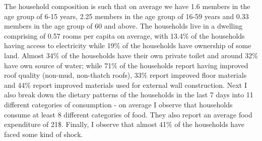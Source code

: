 \documentclass[12pt]{article}
\begin{document}
{\hspace{1cm} The household composition is such that on average we have 1.6 members in the age group of 6-15 years, 2.25 members in the age group of 16-59 years and 0.33 members in the age group of 60 and above. The households live in a dwelling comprising of 0.57 rooms per capita on average, with 13.4\% of the households having access to electricity while 19\% of the households have ownership of some land. Almost 34\% of the households have their own private toilet and around 32\% have own source of water; while 71\% of the households report having improved roof quality (non-mud, non-thatch roofs), 33\% report improved floor materials and 44\% report improved materials used for external wall construction. Next I also break down the dietary patterns of the households in the last 7 days into 11 different categories of consumption - on average I observe that households consume at least 8 different categories of food. They also report an average food expenditure of 21\$. Finally, I observe that almost 41\% of the households have faced some kind of shock.


}
\end{document}
